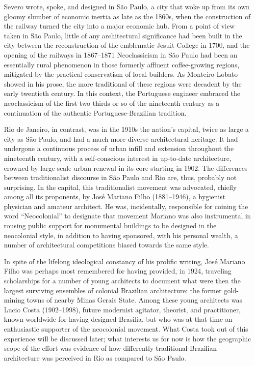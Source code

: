 Severo wrote, spoke, and designed in São Paulo, a city that woke up from
its own gloomy slumber of economic inertia as late as the 1860s, when
the construction of the railway turned the city into a major economic
hub. From a point of view taken in São Paulo, little of any
architectural significance had been built in the city between the
reconstruction of the emblematic Jesuit College in 1700, and the opening
of the railways in 1867--1871 \autocite[p.~72]{lemos:1987ecletismo}
Neoclassicism in São Paulo had been an essentially rural phenomenon in
those formerly affluent coffee-growing regions, mitigated by the
practical conservatism of local builders. As Monteiro Lobato showed in
his prose, the more traditional of these regions were decadent by the
early twentieth century. In this context, the Portuguese engineer
embraced the neoclassicism of the first two thirds or so of the
nineteenth century as a continuation of the authentic
Portuguese-Brazilian tradition.

Rio de Janeiro, in contrast, was in the 1910s the nation's capital,
twice as large a city as São Paulo, and had a much more diverse
architectural heritage. It had undergone a continuous process of urban
infill and extension throughout the nineteenth century, with a
self-conscious interest in up-to-date architecture, crowned by
large-scale urban renewal in its core starting in 1902. The differences
between traditionalist discourse in São Paulo and Rio are, thus,
probably not surprising. In the capital, this traditionalist movement
was advocated, chiefly among all its proponents, by José Mariano Filho
(1881--1946), a hygienist physician and amateur architect. He was,
incidentally, responsible for coining the word ``Neocolonial'' to
designate that movement \autocite[p.~132]{kessel:2008arquitetura}
Mariano was also instrumental in rousing public support for monumental
buildings to be designed in the neocolonial style, in addition to having
sponsored, with his personal wealth, a number of architectural
competitions biased towards the same style.

In spite of the lifelong ideological constancy of his prolific writing,
José Mariano Filho was perhaps most remembered for having provided, in
1924, traveling scholarships for a number of young architects to
document what were then the largest surviving ensembles of colonial
Brazilian architecture: the former gold-mining towns of nearby Minas
Gerais State. Among these young architects was Lucio Costa (1902--1998),
future modernist agitator, theorist, and practitioner, known worldwide
for having designed Brasilia, but who was at that time an enthusiastic
supporter of the neocolonial movement. What Costa took out of this
experience will be discussed later; what interests us for now is how the
geographic scope of the effort was evidence of how differently
traditional Brazilian architecture was perceived in Rio as compared to
São Paulo.

